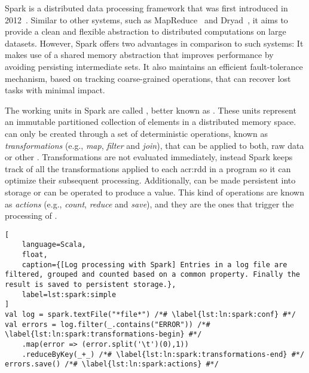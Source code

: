 \label{sec:spark}


Spark is a distributed data processing framework that was first introduced in 2012~\cite{Zaharia2012a}. Similar to other systems, such as MapReduce~\cite{Dean2004} and Dryad~\cite{Isard2007}, it aims to provide a clean and flexible abstraction to distributed computations on large datasets. However, Spark offers two advantages in comparison to such systems: It makes use of a shared memory abstraction that improves performance by avoiding persisting intermediate sets. It also maintains an efficient fault-tolerance mechanism, based on tracking coarse-grained operations, that can recover lost tasks with minimal impact.

The working units in Spark are called \textit{}, better known as . These units represent an immutable partitioned collection of elements in a distributed memory space.  can only be created through a set of deterministic operations, known as \textit{transformations} (e.g., \textit{map}, \textit{filter} and \textit{join}), that can be applied to both, raw data or other . Transformations are not evaluated immediately, instead Spark keeps track of all the transformations applied to each \acrshort{acr:rdd} in a program so it can optimize their subsequent processing. Additionally,  can be made persistent into storage or can be operated to produce a value. This kind of operations are known as \textit{actions} (e.g., \textit{count}, \textit{reduce} and \textit{save}), and they are the ones that trigger the processing of .

\begin{lstlisting}[
	language=Scala,
	float,
	caption={[Log processing with Spark] Entries in a log file are filtered, grouped and counted based on a common property. Finally the result is saved to persistent storage.},
	label=lst:spark:simple
]
val log = spark.textFile("*file*") /*# \label{lst:ln:spark:conf} #*/
val errors = log.filter(_.contains("ERROR")) /*# \label{lst:ln:spark:transformations-begin} #*/
	.map(error => (error.split('\t')(0),1))
	.reduceByKey(_+_) /*# \label{lst:ln:spark:transformations-end} #*/
errors.save() /*# \label{lst:ln:spark:actions} #*/
\end{lstlisting}

